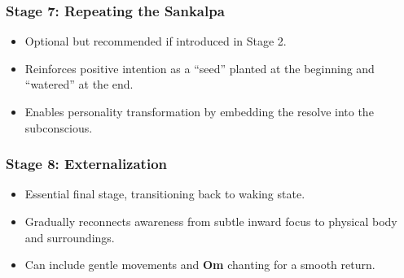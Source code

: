 \begin{frame}[fragile]\frametitle{Stage 7: Repeating the Sankalpa}
    \begin{itemize}
        \item Optional but recommended if introduced in Stage 2.
        \item Reinforces positive intention as a “seed” planted at the beginning and “watered” at the end.
        \item Enables personality transformation by embedding the resolve into the subconscious.
    \end{itemize}
\end{frame}

\begin{frame}[fragile]\frametitle{Stage 8: Externalization}
    \begin{itemize}
        \item Essential final stage, transitioning back to waking state.
        \item Gradually reconnects awareness from subtle inward focus to physical body and surroundings.
        \item Can include gentle movements and \textbf{Om} chanting for a smooth return.
    \end{itemize}
\end{frame}
